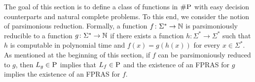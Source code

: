 \newcommand{\pP}{\textit{P}}
\newcommand{\pN}{\textit{N}}
\newcommand{\pV}{\textit{V}}
\newcommand{\pT}{\textit{T}}
\newcommand{\pA}{\textit{A}}
\newcommand{\pNC}{\textit{NC}}
\newcommand{\pD}{\textit{D}}




The goal of this section is to define a class of functions in $\text{\sc \#P}$ with easy decision counterparts and natural complete problems. To this end, we consider the notion of parsimonious reduction. Formally, a function $f\colon\Sigma^* \to \mathbb{N}$ is parsimoniously reducible to a function $g\colon\Sigma^* \to \mathbb{N}$ if there exists a function $h\colon\Sigma^* \to \Sigma^*$ such that $h$ is computable in polynomial time and $f(x) = g(h(x))$ for every $x \in \Sigma^*$. As mentioned at the beginning of this section, if $f$ can be parsimoniously reduced to $g$, then $L_g \in \text{\sc P}$ implies that $L_f \in \text{\sc P}$ and the existence of an FPRAS for $g$ implies the existence of an FPRAS for $f$. 

